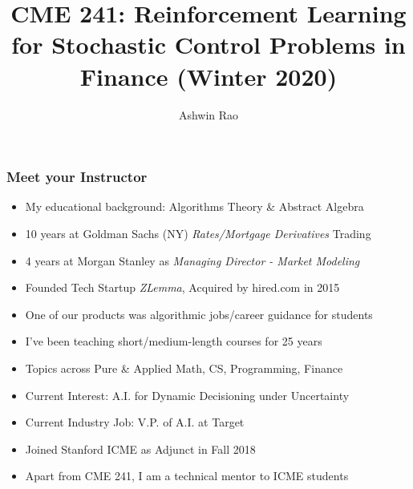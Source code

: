 \documentclass[handout]{beamer}
\title[RL for Finance]{CME 241: Reinforcement Learning for Stochastic Control Problems in Finance (Winter 2020)} %
\author{Ashwin Rao} %
\institute[Stanford] %
{ICME, Stanford University
}
\date{} %
\begin{document}
\begin{frame}
\titlepage %
\end{frame}


\begin{frame}
\frametitle{Meet your Instructor}
\pause
\begin{itemize}[<+->]
\item My educational background: Algorithms Theory \& Abstract Algebra
\item 10 years at Goldman Sachs (NY) {\em Rates/Mortgage Derivatives} Trading
\item 4 years at Morgan Stanley as {\em Managing Director - Market Modeling}
\item Founded Tech Startup {\em ZLemma}, Acquired by hired.com in 2015
\item One of our products was algorithmic jobs/career guidance for students
\item I've been teaching short/medium-length courses for 25 years
\item Topics across Pure \& Applied Math, CS, Programming, Finance
\item Current Interest: A.I. for Dynamic Decisioning under Uncertainty
\item Current Industry Job: V.P. of A.I. at Target
\item Joined Stanford ICME as Adjunct in Fall 2018
\item Apart from CME 241, I am a technical mentor to ICME students
\end{itemize}
\end{frame}
\end{document}
